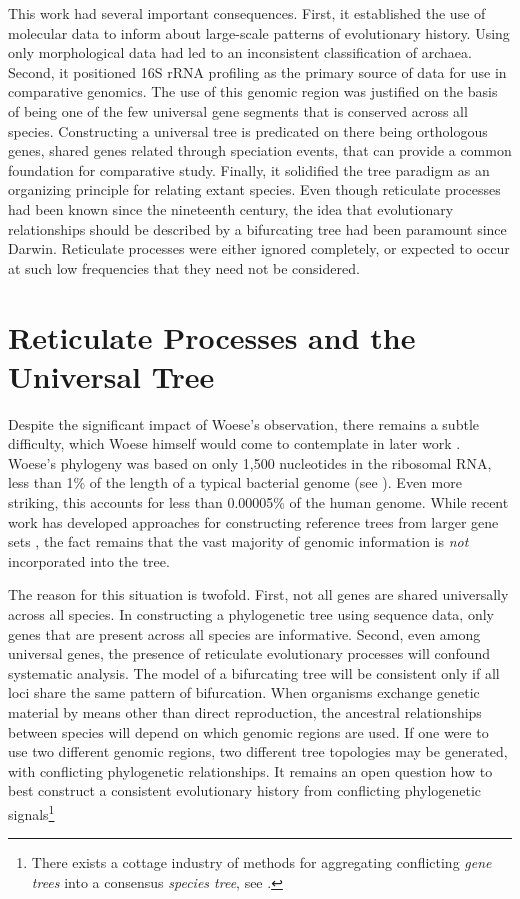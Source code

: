 This work had several important consequences.
First, it established the use of molecular data to inform about large-scale patterns of evolutionary history.
Using only morphological data had led to an inconsistent classification of archaea.
Second, it positioned 16S rRNA profiling as the primary source of data for use in comparative genomics.
The use of this genomic region was justified on the basis of being one of the few universal gene segments that is conserved across all species.
Constructing a universal tree is predicated on there being orthologous genes, shared genes related through speciation events, that can provide a common foundation for comparative study.
Finally, it solidified the tree paradigm as an organizing principle for relating extant species.
Even though reticulate processes had been known since the nineteenth century, the idea that evolutionary relationships should be described by a bifurcating tree had been paramount since Darwin. 
Reticulate processes were either ignored completely, or expected to occur at such low frequencies that they need not be considered.

\section{Reticulate Processes and the Universal Tree}

Despite the significant impact of Woese's observation, there remains a subtle difficulty, which Woese himself would come to contemplate in later work \cite{Woese:2004ba,Goldenfeld:2007im}.
Woese's phylogeny was based on only 1,500 nucleotides in the ribosomal RNA, less than 1\% of the length of a typical bacterial genome (see \cite{Dagan:2006up}).
Even more striking, this accounts for less than 0.00005\% of the human genome.
While recent work has developed approaches for constructing reference trees from larger gene sets \cite{Ciccarelli:2006gw}, the fact remains that the vast majority of genomic information is \emph{not} incorporated into the tree.

The reason for this situation is twofold.
First, not all genes are shared universally across all species.
In constructing a phylogenetic tree using sequence data, only genes that are present across all species are informative.
Second, even among universal genes, the presence of reticulate evolutionary processes will confound systematic analysis.
The model of a bifurcating tree will be consistent only if all loci share the same pattern of bifurcation.
When organisms exchange genetic material by means other than direct reproduction, the ancestral relationships between species will depend on which genomic regions are used.
If one were to use two different genomic regions, two different tree topologies may be generated, with conflicting phylogenetic relationships.
It remains an open question how to best construct a consistent evolutionary history from conflicting phylogenetic signals\footnote{There exists a cottage industry of methods for aggregating conflicting \emph{gene trees} into a consensus \emph{species tree}, see \cite{Maddison:1997ew}.}

